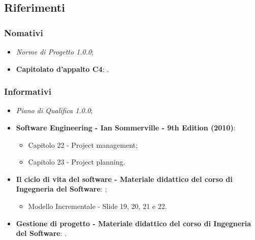 \subsection{Riferimenti}
\subsubsection{Nomativi}
\begin{itemize}
    \item \textit{Norme di Progetto 1.0.0};
    \item \textbf{Capitolato d'appalto C4}: \newline {}.
\end{itemize}

\subsubsection{Informativi}
\begin{itemize}
    \item \textit{Piano di Qualifica 1.0.0};
    \item \textbf{Software Engineering - Ian Sommerville - 9th Edition (2010)}:
        \begin{itemize}
            \item Capitolo 22 - Project management;
            \item Capitolo 23 - Project planning.
        \end{itemize}
    \item \textbf{Il ciclo di vita del software - Materiale didattico del corso di Ingegneria del Software}: \newline {};
        \begin{itemize}
            \item Modello Incrementale - Slide 19, 20, 21 e 22.
        \end{itemize}
    \item \textbf{Gestione di progetto - Materiale didattico del corso di Ingegneria del Software}: \newline {}.
\end{itemize}



